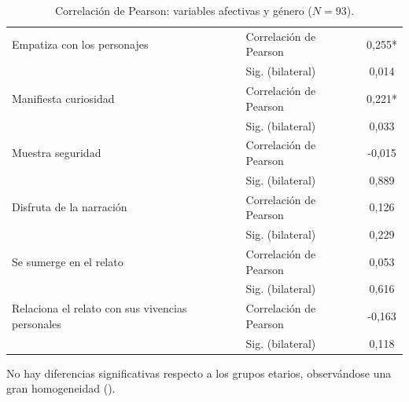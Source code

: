 \documentclass[spanish]{textolivre}
\begin{document}
\begin{table}[htpb]
\centering
\begin{threeparttable}
\caption{Correlación de Pearson: variables afectivas y género ($N=93$).}
\label{tbl15}
\begin{tabular}{llS}
\toprule
 & &  \\
\midrule
Empatiza con los personajes & Correlación de Pearson & 0,255* \\
 & Sig. (bilateral) & 0,014 \\
Manifiesta curiosidad & Correlación de Pearson & 0,221* \\
 & Sig. (bilateral) & 0,033 \\
Muestra seguridad & Correlación de Pearson & -0,015 \\
 & Sig. (bilateral) & 0,889 \\
Disfruta de la narración & Correlación de Pearson & 0,126 \\
 & Sig. (bilateral) & 0,229 \\
Se sumerge en el relato & Correlación de Pearson & 0,053 \\
 & Sig. (bilateral) & 0,616 \\
Relaciona el relato con sus vivencias personales & Correlación de Pearson & -0,163 \\
 & Sig. (bilateral) & 0,118 \\
\bottomrule
\end{tabular}
\end{threeparttable}
\end{table}

No hay diferencias significativas respecto a los grupos etarios, observándose una gran homogeneidad ().
\end{document}
